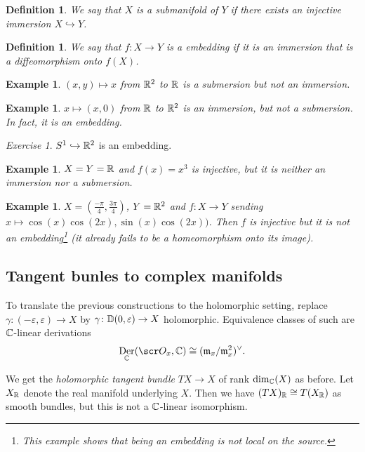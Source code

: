 \documentclass[A4paper, british, reqno]{amsart}
\theoremstyle{darkgreentheorem}
\theoremstyle{darkbluedefinition}
\newtheorem{defn}[thm]{Definition}
\theoremstyle{darkredexample}
\newtheorem{exa}[thm]{Example}
\theoremstyle{remark}
\newtheorem{exe}[thm]{Exercise}
\DeclareMathOperator{\Der}{Der}
\newcommand{\1}{\mathbbm{1}}
\newcommand{\dual}{^{\vee}}
\newcommand{\mono}{\hookrightarrow}
\begin{document}
\begin{defn}
    We say that $X$ is a \textit{submanifold} of $Y$ if there exists an injective immersion $X\mono Y$.
\end{defn}

\begin{defn}
    We say that $f\colon X\to Y$ is a \textit{embedding} if it is an immersion that is a diffeomorphism onto $f(X)$.
\end{defn}

\begin{exa}
    $(x,y)\mapsto x$ from $\mathbb{R}^{2}$ to $\mathbb{R}$ is a submersion but not an immersion.
\end{exa}

\begin{exa}
    $x\mapsto (x,0)$ from $\mathbb{R}$ to $\mathbb{R}^{2}$ is an immersion, but not a submersion.
    In fact, it is an embedding.
\end{exa}

\begin{exe}
    $S^{1}\mono \R^{2}$ is an embedding.
\end{exe}

\begin{exa}
    $X=Y=\mathbb{R}$ and $f(x)=x^{3}$ is injective, but it is neither an immersion nor a submersion.
\end{exa}

\begin{exa}
    $X=(\frac{-\pi}{4},\frac{3\pi}{4})$, $Y=\mathbb{R}^{2}$ and $f\colon X\to Y$ sending $x\mapsto \cos(x)\cos(2x),\sin(x)\cos(2x))$.
    Then $f$ is injective but it is not an embedding\footnote{This example shows that being an embedding is not local on the source.} (it already fails to be a homeomorphism onto its image).
\end{exa}

\subsection{Tangent bunles to complex manifolds}

To translate the previous constructions to the holomorphic setting, replace $\gamma\colon (-\varepsilon,\varepsilon)\to X$ by $\gamma\colon \mathbb{D}(0,\varepsilon)\to X$ holomorphic.
Equivalence classes of such are $\mathbb{C}$-linear derivations
\[ \Der_{\C}(\O_{x},\C)\cong (\m_{x}/\m_{x}^{2})\dual. \]

We get the \textit{holomorphic tangent bundle} $TX\to X$ of rank $\dim_{\mathbb{C}}(X)$ as before.
Let $X_{\mathbb{R}}$ denote the real manifold underlying $X$.
Then we have $(TX)_{\mathbb{R}}\cong T(X_{\mathbb{R}})$ as smooth bundles, but this is not a $\mathbb{C}$-linear isomorphism.
\end{document}

